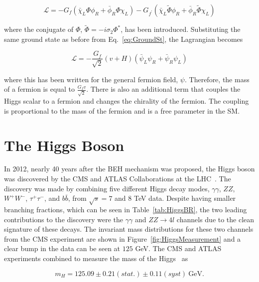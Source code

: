\begin{equation}
\mathcal{L}= -G_{f}(\bar{\chi}_{L}\Phi\phi_{R} + \bar{\phi}_{R}\Phi\chi_{L}) - G_{f^{\prime}}(\bar{\chi}_{L}\widetilde{\Phi}\phi_{R} + \bar{\phi}_{R}\widetilde{\Phi}\chi_{L})
\end{equation}

\noindent
where the conjugate of $\Phi$, $\widetilde{\Phi}=-i\sigma_{2}\Phi^{\ast}$, has been introduced. Substituting the same ground state as before from Eq.~\ref{eq:GroundSt}, the Lagrangian becomes


\begin{equation}
\mathcal{L}=-\frac{G_{f}}{\sqrt{2}}(v+H)(\bar{\psi}_{L}\psi_{R} + \bar{\psi}_{R}\psi_{L})
\end{equation}


\noindent
where this has been written for the general fermion field, $\psi$. Therefore, the mass of a fermion is equal to $\frac{G_{f}v}{\sqrt{2}}$. There is also an additional term that couples the Higgs scalar to a fermion and changes the chirality of the fermion. The coupling is proportional to the mass of the fermion and is a free parameter in the SM. 


\section{The Higgs Boson}

In 2012, nearly 40 years after the BEH mechanism was proposed, the Higgs boson was discovered by the CMS and ATLAS Collaborations at the LHC~\cite{ATLASHiggs, CMSHiggs}. The discovery was made by combining five different Higgs decay modes, $\gamma\gamma$, $ZZ$, $W^{+}W^{-}$, $\tau^{+}\tau^{-}$, and $b\bar{b}$, from $\sqrt{s}=7$ and $8$ TeV data. Despite having smaller branching fractions, which can be seen in Table~\ref{tab:HiggsBR}, the two leading contributions to the discovery were the $\gamma\gamma$ and $ZZ\rightarrow 4l$ channels due to the clean signature of these decays. The invariant mass distributions for these two channels from the CMS experiment are shown in Figure~\ref{fig:HiggsMeasurement} and a clear bump in the data can be seen at $125$ GeV. The CMS and ATLAS experiments combined to measure the mass of the Higgs~\cite{CombinedHiggs} as

\begin{equation}
m_{H}=125.09\pm 0.21(stat.)\pm 0.11(syst) ~\mathrm{GeV}.
\end{equation}

